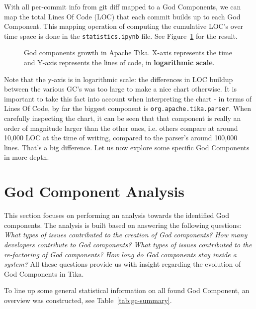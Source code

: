 \documentclass{article}
\begin{document}
With all per-commit info from git diff mapped to a God Components, we can map the total Lines Of Code (LOC) that each commit builds up to each God Component. This mapping operation of computing the cumulative LOC's over time space is done in the \texttt{statistics.ipynb} file. See Figure~\ref{fig:loc_growth} for the result.

\begin{figure}[ht]
    \centering
    
    \label{fig:loc_growth}
    \caption{God components growth in Apache Tika. X-axis represents the time and Y-axis represents the lines of code, in \textbf{logarithmic scale}.}
\end{figure}

Note that the y-axis is in logarithmic scale: the differences in LOC buildup between the various GC's was too large to make a nice chart otherwise. It is important to take this fact into account when interpreting the chart - in terms of Lines Of Code, by far the biggest component is \texttt{org.apache.tika.parser}. When carefully inspecting the chart, it can be seen that that component is really an order of magnitude larger than the other ones, i.e. others compare at around 10,000 LOC at the time of writing, compared to the parser's around 100,000 lines. That's a big difference. Let us now explore some specific God Components in more depth.

\section{God Component Analysis}
This section focuses on performing an analysis towards the identified God components. The analysis is built based on answering the following questions: \textit{What types of issues contributed to the creation of God components? How many developers contribute to God components? What types of issues contributed to the re-factoring of God components? How long do God components stay inside a system?} All these questions provide us with insight regarding the evolution of God Components in Tika.

To line up some general statistical information on all found God Component, an overview was constructed, see Table~\ref{tab:gc-summary}.
\end{document}

